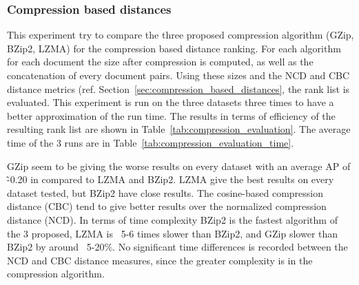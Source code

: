 \subsubsection{Compression based distances}

This experiment try to compare the three proposed compression algorithm (GZip, BZip2, LZMA) for the compression based distance ranking.
For each algorithm for each document the size after compression is computed, as well as the concatenation of every document pairs.
Using these sizes and the NCD and CBC distance metrics (ref. Section~\ref{sec:compression_based_distances}, the rank list is evaluated.
This experiment is run on the three datasets three times to have a better approximation of the run time.
The results in terms of efficiency of the resulting rank list are shown in Table~\ref{tab:compression_evaluation}.
The average time of the 3 runs are in Table~\ref{tab:compression_evaluation_time}.

GZip seem to be giving the worse results on every dataset with an average AP of \~-0.20 in compared to LZMA and BZip2.
LZMA give the best results on every dataset tested, but BZip2 have close results.
The cosine-based compression distance (CBC) tend to give better results over the normalized compression distance (NCD).
In terms of time complexity BZip2 is the fastest algorithm of the 3 proposed, LZMA is ~5-6 times slower than BZip2, and GZip slower than BZip2 by around ~5-20\%.
No significant time differences is recorded between the NCD and CBC distance measures, since the greater complexity is in the compression algorithm.


